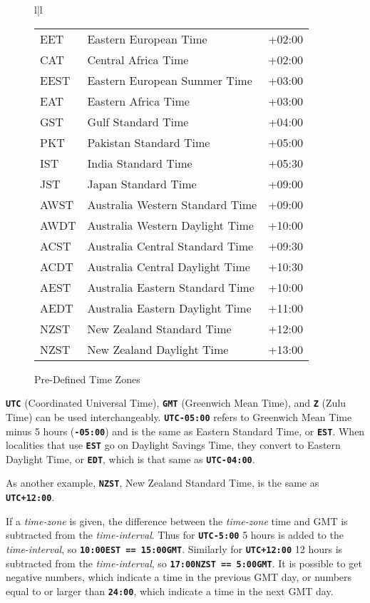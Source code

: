 \documentclass[12pt]{article}
\makeatletter
\newcommand{\TT}[1]{{\tt \bfseries #1}}
\newcommand{\ttkey}[1]{\TT{#1}\index{#1@{\tt #1}}}
\newlength{\figurewidth}
\newenvironment{boxedfigure}[1][!btp]%
	{\begin{figure*}[#1]
	 \begin{lrbox}{\figurebox}
	 \begin{minipage}{\figurewidth}

	 \vspace*{1ex}}%
	{
	 \vspace*{1ex}

	 \end{minipage}
	 \end{lrbox}
	 \begin{center}
	 \fbox{\hspace*{0.1in}\usebox{\figurebox}\hspace*{0.1in}}
	 \end{center}
	 \end{figure*}}
\makeatother
\begin{document}
\begin{boxedfigure}[t]
\begin{center}
\begin{tabular}{l|l}
\begin{tabular}[t]{@{}lll@{}}
EET   & Eastern European Time         & +02:00 \\
CAT   & Central Africa Time           & +02:00 \\
EEST  & Eastern European Summer Time  & +03:00 \\
EAT   & Eastern Africa Time           & +03:00 \\
GST   & Gulf Standard Time            & +04:00 \\
PKT   & Pakistan Standard Time        & +05:00 \\
IST   & India Standard Time           & +05:30 \\
JST   & Japan Standard Time           & +09:00 \\
AWST  & Australia Western Standard Time        & +09:00 \\
AWDT  & Australia Western Daylight Time        & +10:00 \\
ACST  & Australia Central Standard Time        & +09:30 \\
ACDT  & Australia Central Daylight Time        & +10:30 \\
AEST  & Australia Eastern Standard Time        & +10:00 \\
AEDT  & Australia Eastern Daylight Time        & +11:00 \\
NZST  & New Zealand Standard Time     & +12:00 \\
NZST  & New Zealand Daylight Time     & +13:00 \\
\end{tabular}
\end{tabular}
\end{center}
\vspace*{-3ex}
\caption{Pre-Defined Time Zones}
\label{PRE-DEFINED-TIME-ZONES}
\end{boxedfigure}

\ttkey{UTC} (Coordinated Universal Time), \ttkey{GMT}
(Greenwich Mean Time), and \ttkey{Z} (Zulu Time) can be used interchangeably.
\TT{UTC-05:00} refers to Greenwich Mean Time
minus 5 hours (\TT{-05:00}) and is the same as
Eastern Standard Time, or \TT{EST}.   When localities that use \TT{EST}
go on Daylight Savings Time, they convert to Eastern Daylight Time, or
\TT{EDT}, which is that same as \TT{UTC-04:00}.

As another example, \TT{NZST}, New Zealand Standard Time, is the same
as \TT{UTC+12:00}.

If a {\em time-zone} is given, the difference between the {\em time-zone}
time and GMT is subtracted from the {\em time-interval}.
Thus for \TT{UTC-5:00} 5 hours is added to the {\em time-interval},
so \TT{10:00EST == 15:00GMT}.
Similarly
for \TT{UTC+12:00} 12 hours is subtracted from the {\em time-interval},
so \TT{17:00NZST == 5:00GMT}.
It is possible to get negative numbers, which indicate a time in the previous
GMT day, or numbers equal to or larger than \TT{24:00}, which indicate
a time in the next GMT day.
\end{document}
